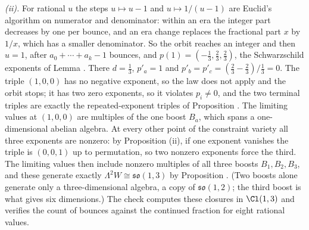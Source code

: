 \emph{(ii).} For rational $u$ the steps $u \mapsto u - 1$ and $u \mapsto 1/(u - 1)$ are Euclid's algorithm on numerator and denominator: within an era the integer part decreases by one per bounce, and an era change replaces the fractional part $x$ by $1/x$, which has a smaller denominator. So the orbit reaches an integer and then $u = 1$, after $a_{0} + \cdots + a_{k} - 1$ bounces, and $p(1) = (-\tfrac13, \tfrac23, \tfrac23)$, the Schwarzschild exponents of Lemma . There $d = \tfrac13$, $p'_{a} = 1$ and $p'_{b} = p'_{c} = (\tfrac23 - \tfrac23)/\tfrac13 = 0$. The triple $(1, 0, 0)$ has no negative exponent, so the law does not apply and the orbit stops; it has two zero exponents, so it violates $p_{i} \neq 0$, and the two terminal triples are exactly the repeated-exponent triples of Proposition . The limiting values at $(1, 0, 0)$ are multiples of the one boost $B_{a}$, which spans a one-dimensional abelian algebra. At every other point of the constraint variety all three exponents are nonzero: by Proposition (ii), if one exponent vanishes the triple is $(0, 0, 1)$ up to permutation, so two nonzero exponents force the third. The limiting values then include nonzero multiples of all three boosts $B_{1}, B_{2}, B_{3}$, and these generate exactly $\Lambda^{2}W \cong \mathfrak{so}(1,3)$ by Proposition . (Two boosts alone generate only a three-dimensional algebra, a copy of $\mathfrak{so}(1,2)$; the third boost is what gives six dimensions.) The check computes these closures in $\Cl(1,3)$ and verifies the count of bounces against the continued fraction for eight rational values.

